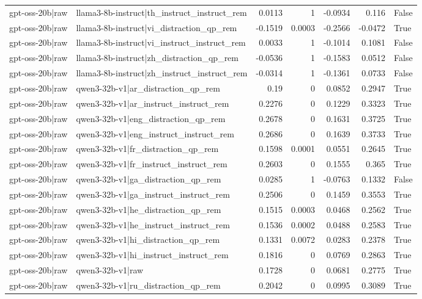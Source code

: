 \begin{table}
\begin{tabular}{l l r r r r l}
gpt-oss-20b|raw & llama3-8b-instruct|th_instruct_instruct_rem & 0.0113 & 1 & -0.0934 & 0.116 & False \\
gpt-oss-20b|raw & llama3-8b-instruct|vi_distraction_qp_rem & -0.1519 & 0.0003 & -0.2566 & -0.0472 & True \\
gpt-oss-20b|raw & llama3-8b-instruct|vi_instruct_instruct_rem & 0.0033 & 1 & -0.1014 & 0.1081 & False \\
gpt-oss-20b|raw & llama3-8b-instruct|zh_distraction_qp_rem & -0.0536 & 1 & -0.1583 & 0.0512 & False \\
gpt-oss-20b|raw & llama3-8b-instruct|zh_instruct_instruct_rem & -0.0314 & 1 & -0.1361 & 0.0733 & False \\
gpt-oss-20b|raw & qwen3-32b-v1|ar_distraction_qp_rem & 0.19 & 0 & 0.0852 & 0.2947 & True \\
gpt-oss-20b|raw & qwen3-32b-v1|ar_instruct_instruct_rem & 0.2276 & 0 & 0.1229 & 0.3323 & True \\
gpt-oss-20b|raw & qwen3-32b-v1|eng_distraction_qp_rem & 0.2678 & 0 & 0.1631 & 0.3725 & True \\
gpt-oss-20b|raw & qwen3-32b-v1|eng_instruct_instruct_rem & 0.2686 & 0 & 0.1639 & 0.3733 & True \\
gpt-oss-20b|raw & qwen3-32b-v1|fr_distraction_qp_rem & 0.1598 & 0.0001 & 0.0551 & 0.2645 & True \\
gpt-oss-20b|raw & qwen3-32b-v1|fr_instruct_instruct_rem & 0.2603 & 0 & 0.1555 & 0.365 & True \\
gpt-oss-20b|raw & qwen3-32b-v1|ga_distraction_qp_rem & 0.0285 & 1 & -0.0763 & 0.1332 & False \\
gpt-oss-20b|raw & qwen3-32b-v1|ga_instruct_instruct_rem & 0.2506 & 0 & 0.1459 & 0.3553 & True \\
gpt-oss-20b|raw & qwen3-32b-v1|he_distraction_qp_rem & 0.1515 & 0.0003 & 0.0468 & 0.2562 & True \\
gpt-oss-20b|raw & qwen3-32b-v1|he_instruct_instruct_rem & 0.1536 & 0.0002 & 0.0488 & 0.2583 & True \\
gpt-oss-20b|raw & qwen3-32b-v1|hi_distraction_qp_rem & 0.1331 & 0.0072 & 0.0283 & 0.2378 & True \\
gpt-oss-20b|raw & qwen3-32b-v1|hi_instruct_instruct_rem & 0.1816 & 0 & 0.0769 & 0.2863 & True \\
gpt-oss-20b|raw & qwen3-32b-v1|raw & 0.1728 & 0 & 0.0681 & 0.2775 & True \\
gpt-oss-20b|raw & qwen3-32b-v1|ru_distraction_qp_rem & 0.2042 & 0 & 0.0995 & 0.3089 & True \\

\end{tabular}
\end{table}
